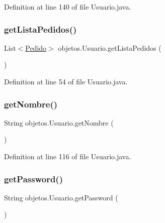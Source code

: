 Definition at line 140 of file Usuario.\+java.

\mbox{\label{classobjetos_1_1_usuario_af3fd03fa3c7765c9005a75d70256288e}} 
\subsubsection{\texorpdfstring{get\+Lista\+Pedidos()}{getListaPedidos()}}
{\footnotesize\ttfamily List$<$\mbox{\hyperlink{classobjetos_1_1_pedido}{Pedido}}$>$ objetos.\+Usuario.\+get\+Lista\+Pedidos (\begin{DoxyParamCaption}{ }\end{DoxyParamCaption})}



Definition at line 54 of file Usuario.\+java.

\mbox{\label{classobjetos_1_1_usuario_a055ad022318e4a768f4586d7a114653d}} 
\subsubsection{\texorpdfstring{get\+Nombre()}{getNombre()}}
{\footnotesize\ttfamily String objetos.\+Usuario.\+get\+Nombre (\begin{DoxyParamCaption}{ }\end{DoxyParamCaption})}



Definition at line 116 of file Usuario.\+java.

\mbox{\label{classobjetos_1_1_usuario_a78a59647b3bfd56744741973ff9521ff}} 
\subsubsection{\texorpdfstring{get\+Password()}{getPassword()}}
{\footnotesize\ttfamily String objetos.\+Usuario.\+get\+Password (\begin{DoxyParamCaption}{ }\end{DoxyParamCaption})}



